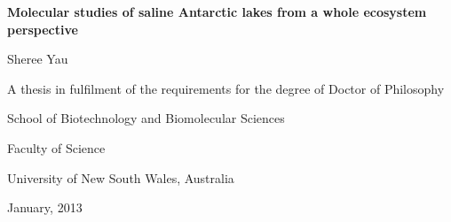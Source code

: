 \begin{titlepage}
\begin{center}
\vspace*{1in}
\LARGE{\textbf{Molecular studies of saline Antarctic lakes from a whole ecosystem perspective}}
\par
\vspace{1.5in}
\LARGE{Sheree Yau}
\vfill
\par
\normalsize{A thesis in fulfilment of the requirements for the degree of Doctor of Philosophy}
\par
\vspace{0.5in}
\normalsize{School of Biotechnology and Biomolecular Sciences}
\par
\normalsize{Faculty of Science}
\par
\large{University of New South Wales, Australia}
\par
\vspace{0.5in}
\normalsize{January, 2013}
\par
\vspace{0.5in}
\end{center}
\end{titlepage}
